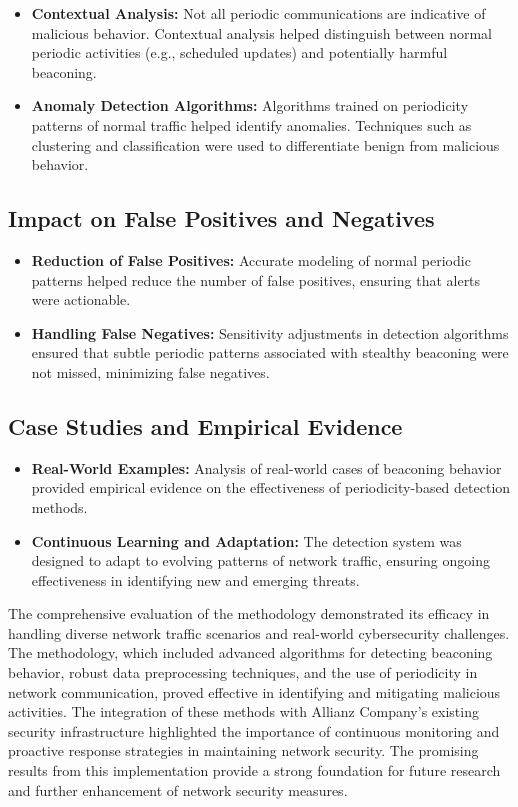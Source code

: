 \begin{itemize}
    \item \textbf{Contextual Analysis:} Not all periodic communications are indicative of malicious behavior. Contextual analysis helped distinguish between normal periodic activities (e.g., scheduled updates) and potentially harmful beaconing.
    \item \textbf{Anomaly Detection Algorithms:} Algorithms trained on periodicity patterns of normal traffic helped identify anomalies. Techniques such as clustering and classification were used to differentiate benign from malicious behavior.
\end{itemize}

\subsection{Impact on False Positives and Negatives}

\begin{itemize}
    \item \textbf{Reduction of False Positives:} Accurate modeling of normal periodic patterns helped reduce the number of false positives, ensuring that alerts were actionable.
    \item \textbf{Handling False Negatives:} Sensitivity adjustments in detection algorithms ensured that subtle periodic patterns associated with stealthy beaconing were not missed, minimizing false negatives.
\end{itemize}

\subsection{Case Studies and Empirical Evidence}

\begin{itemize}
    \item \textbf{Real-World Examples:} Analysis of real-world cases of beaconing behavior provided empirical evidence on the effectiveness of periodicity-based detection methods.
    \item \textbf{Continuous Learning and Adaptation:} The detection system was designed to adapt to evolving patterns of network traffic, ensuring ongoing effectiveness in identifying new and emerging threats.
\end{itemize}

The comprehensive evaluation of the methodology demonstrated its efficacy in handling diverse network traffic scenarios and real-world cybersecurity challenges. The methodology, which included advanced algorithms for detecting beaconing behavior, robust data preprocessing techniques, and the use of periodicity in network communication, proved effective in identifying and mitigating malicious activities. The integration of these methods with Allianz Company’s existing security infrastructure highlighted the importance of continuous monitoring and proactive response strategies in maintaining network security. The promising results from this implementation provide a strong foundation for future research and further enhancement of network security measures.
